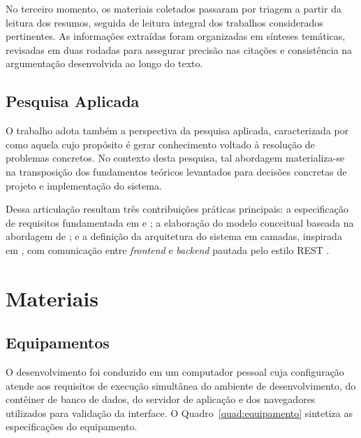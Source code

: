 No terceiro momento, os materiais coletados passaram por triagem a partir da leitura dos resumos, seguida de leitura integral dos trabalhos considerados pertinentes. As informações extraídas foram organizadas em sínteses temáticas, revisadas em duas rodadas para assegurar precisão nas citações e consistência na argumentação desenvolvida ao longo do texto.

\subsection{Pesquisa Aplicada}

O trabalho adota também a perspectiva da pesquisa aplicada, caracterizada por \cite{gerhardt2009} como aquela cujo propósito é gerar conhecimento voltado à resolução de problemas concretos. No contexto desta pesquisa, tal abordagem materializa-se na transposição dos fundamentos teóricos levantados para decisões concretas de projeto e implementação do sistema.

Dessa articulação resultam três contribuições práticas principais: a especificação de requisitos fundamentada em \cite{Sommerville2011} e \cite{pressman2016}; a elaboração do modelo conceitual baseada na abordagem de \cite{Larman2007}; e a definição da arquitetura do sistema em camadas, inspirada em \cite{Fowler2002}, com comunicação entre \textit{frontend} e \textit{backend} pautada pelo estilo REST \cite{Fielding2000}.

\section{Materiais}
\label{sec:materiais}

\subsection{Equipamentos}

O desenvolvimento foi conduzido em um computador pessoal cuja configuração atende aos requisitos de execução simultânea do ambiente de desenvolvimento, do contêiner de banco de dados, do servidor de aplicação e dos navegadores utilizados para validação da interface. O Quadro~\ref{quad:equipamento} sintetiza as especificações do equipamento.

